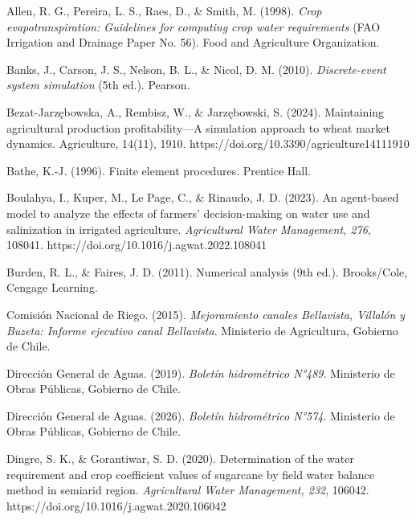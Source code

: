 \documentclass[12pt]{report}
\begin{document}
\begin{thebibliography}{}

\bibitem{}\hypertarget{ref:allen1998}{Allen, R. G., Pereira, L. S., Raes, D., \& Smith, M. (1998). \textit{Crop evapotranspiration: Guidelines for computing crop water requirements} (FAO Irrigation and Drainage Paper No. 56). Food and Agriculture Organization.}
\vspace{0.3cm} 
\bibitem{}\hypertarget{ref:banks2010}{Banks, J., Carson, J. S., Nelson, B. L., \& Nicol, D. M. (2010). \textit{Discrete-event system simulation} (5th ed.). Pearson.} 

\vspace{0.3cm} 
\bibitem{}\hypertarget{ref:bezat2024}{Bezat-Jarzębowska, A., Rembisz, W., \& Jarzębowski, S. (2024). Maintaining agricultural production profitability—A simulation approach to wheat market dynamics. Agriculture, 14(11), 1910.   
https://doi.org/10.3390/agriculture14111910}
\vspace{0.3cm} 
\bibitem{}\hypertarget{ref:bathe1996}{Bathe, K.-J. (1996). Finite element procedures. Prentice Hall.}
\vspace{0.3cm} 
\bibitem{}\hypertarget{ref:boulahya2023}{Boulahya, I., Kuper, M., Le Page, C., \& Rinaudo, J. D. (2023). An agent-based model to analyze the effects of farmers’ decision-making on water use and salinization in irrigated agriculture. \textit{Agricultural Water Management, 276}, 108041. https://doi.org/10.1016/j.agwat.2022.108041}

\vspace{0.3cm} 
\bibitem{}\hypertarget{ref:burden2011}{Burden, R. L., \& Faires, J. D. (2011). Numerical analysis (9th ed.). Brooks/Cole, Cengage Learning.}

\vspace{0.3cm} 
\bibitem{}\hypertarget{ref:cnr2015}{Comisión Nacional de Riego. (2015). \textit{Mejoramiento canales Bellavista, Villalón y Buzeta: Informe ejecutivo canal Bellavista}. Ministerio de Agricultura, Gobierno de Chile.}

\vspace{0.3cm} 
\bibitem{}\hypertarget{ref:dga2019}{Dirección General de Aguas. (2019). \textit{Boletín hidrométrico N°489}. Ministerio de Obras Públicas, Gobierno de Chile.}
\vspace{0.3cm} 
\bibitem{}\hypertarget{ref:dga2026}{Dirección General de Aguas. (2026). \textit{Boletín hidrométrico N°574}. Ministerio de Obras Públicas, Gobierno de Chile.}

\vspace{0.3cm} 
\bibitem{}\hypertarget{ref:dingre2020}{Dingre, S. K., \& Gorantiwar, S. D. (2020). Determination of the water requirement and crop coefficient values of sugarcane by field water balance method in semiarid region. \textit{Agricultural Water Management, 232}, 106042. https://doi.org/10.1016/j.agwat.2020.106042}


\end{thebibliography}
\end{document}
